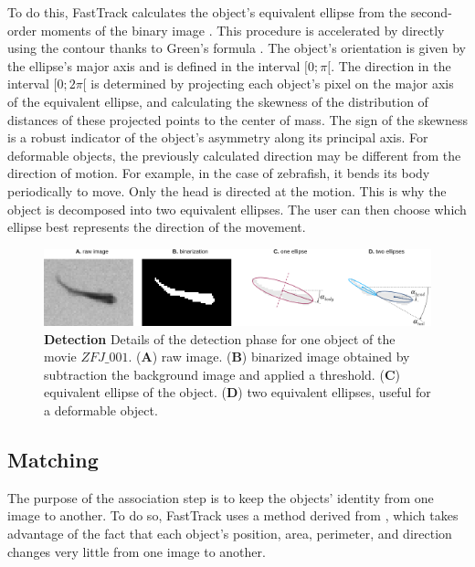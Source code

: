     To do this, FastTrack calculates the object's equivalent ellipse from the second-order moments of the binary image \cite{rocha2002image}. This procedure is accelerated by directly using the contour thanks to Green's formula \cite{riemann_1851}. The object's orientation is given by the ellipse's major axis and is defined in the interval $[0;\pi[$. The direction in the interval $[0; 2\pi[ $ is determined by projecting each object's pixel on the major axis of the equivalent ellipse, and calculating the skewness of the distribution of distances of these projected points to the center of mass. The sign of the skewness is a robust indicator of the object's asymmetry along its principal axis.
    For deformable objects, the previously calculated direction may be different from the direction of motion. For example, in the case of zebrafish, it bends its body periodically to move. Only the head is directed at the motion. This is why the object is decomposed into two equivalent ellipses. The user can then choose which ellipse best represents the direction of the movement.

    \begin{figure}[h!]
    \centering
    \includegraphics[width=1\textwidth]{part_1/assets/Figure_ellipse.png}
    \caption{\textbf{Detection} Details of the detection phase for one object of the movie $ZFJ\_001$.
        (\textbf{A}) raw image.
        (\textbf{B}) binarized image obtained by subtraction the background image and applied a threshold.
        (\textbf{C}) equivalent ellipse of the object.
        (\textbf{D}) two equivalent ellipses, useful for a deformable object.}
    \label{part_1:fig_2}
    \end{figure}

    \subsection{Matching}
    The purpose of the association step is to keep the objects' identity from one image to another. To do so, FastTrack uses a method derived from \cite{qian2016effective}, which takes advantage of the fact that each object's position, area, perimeter, and direction changes very little from one image to another.

